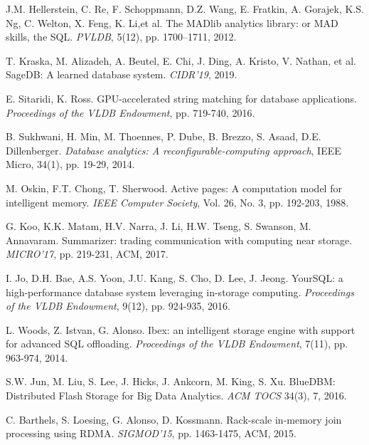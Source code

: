 \documentclass[11pt]{article}
\begin{document}
\begin{thebibliography}{10}
 J.M. Hellerstein, C. Re, F. Schoppmann, D.Z. Wang, E. Fratkin, A. Gorajek, K.S. Ng, C. Welton, X. Feng, K. Li,et al. \newblock The MADlib analytics library: or MAD skills, the SQL. \newblock \emph{PVLDB}, 5(12), pp. 1700–1711, 2012.

 T. Kraska, M. Alizadeh, A. Beutel, E. Chi, J. Ding, A. Kristo, V. Nathan, et al. \newblock SageDB: A learned database system. \newblock \emph{CIDR'19}, 2019.

 E. Sitaridi, K. Ross. \newblock GPU-accelerated string matching for database applications. \newblock \emph{Proceedings of the VLDB Endowment}, pp. 719-740, 2016.

 B. Sukhwani, H. Min, M. Thoennes, P. Dube, B. Brezzo, S. Asaad, D.E. Dillenberger. \newblock \emph{Database analytics: A reconfigurable-computing approach}, IEEE Micro, 34(1), pp. 19-29, 2014.

 M. Oskin, F.T. Chong, T. Sherwood. \newblock Active pages: A computation model for intelligent memory. \newblock \emph{IEEE Computer Society}, Vol. 26, No. 3, pp. 192-203, 1988.

 G. Koo, K.K. Matam, H.V. Narra, J. Li, H.W. Tseng, S. Swanson, M. Annavaram. \newblock Summarizer: trading communication with computing near storage. \newblock \emph{MICRO'17}, pp. 219-231, ACM, 2017.

 I. Jo, D.H. Bae, A.S. Yoon, J.U. Kang, S. Cho, D. Lee, J. Jeong. \newblock YourSQL: a high-performance database system leveraging in-storage computing. \newblock \emph{Proceedings of the VLDB Endowment}, 9(12), pp. 924-935, 2016.

 L. Woods, Z. Istvan, G. Alonso. \newblock Ibex: an intelligent storage engine with support for advanced SQL offloading. \newblock \emph{Proceedings of the VLDB Endowment}, 7(11), pp. 963-974, 2014.

 S.W. Jun, M. Liu, S. Lee, J. Hicks, J. Ankcorn, M. King, S. Xu. \newblock BlueDBM: Distributed Flash Storage for Big Data Analytics. \newblock \emph{ACM TOCS} 34(3), 7, 2016.

 C. Barthels, S. Loesing, G. Alonso, D. Kossmann. \newblock Rack-scale in-memory join processing using RDMA. \newblock \emph{SIGMOD'15}, pp. 1463-1475, ACM, 2015.


\end{thebibliography}
\end{document}
